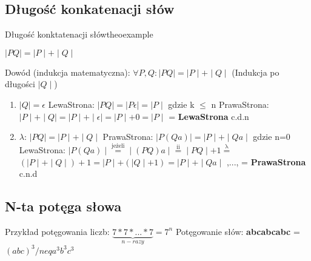 	\subsection{Długość konkatenacji słów}
		\begin{mytheo}{Długość konktatenacji słów}{theoexample}
	
			\begin{center}
			$\mid PQ \mid = \mid P \mid + \mid Q \mid$
			\end{center}
			
			Dowód (indukcja matematyczna):\newline
			$\forall P,Q: \mid PQ \mid = \mid P \mid + \mid Q \mid$ 
			(Indukcja po długości $\mid Q \mid$)
			
			\begin{enumerate}[label=(\roman*)]
				\item $\mid Q \mid = \epsilon$ \newline
				LewaStrona: $\mid PQ \mid = \mid P \epsilon \mid = \mid P \mid$ gdzie 
				k $ \leq $ n \newline
				PrawaStrona: $\mid P \mid + \mid Q \mid = 
				\mid P \mid + \mid \epsilon \mid = 
				\mid P \mid+ 0 = \mid P \mid $ = { \bf LewaStrona} c.d.n \newline
				  
				  
				\item  $\lambda$: $\mid PQ \mid = \mid P \mid + \mid Q \mid $ \newline
				PrawaStrona: $\mid P(Qa) \mid = \mid P \mid  + \mid Qa \mid$  gdzie n=0\newline
				LewaStrona: $ \mid P(Qa) \mid \overset{\mathrm{jeżeli}}{=} 
				\mid (PQ)a \mid \overset{\mathrm{ii}}{=} 
				\mid PQ \mid + 1 \overset{\mathrm{\lambda}}{=}$ \newline
				$(\mid P \mid + \mid Q \mid) + 1 = 
				\mid P \mid + (\mid Q \mid + 1) = 
				\mid P \mid + \mid Qa \mid$ ,..., = { \bf  PrawaStrona } c.n.d
			
			\end{enumerate} 
		\end{mytheo}

	
	\subsection{N-ta potęga słowa}
		Przykład potęgowania liczb: \textbf{$ \underbrace{7*7* ... *7}_{n-razy} = 7^{n}$}\newline
		Potęgowanie słów: \textbf{abcabcabc} = $(abc)^{3} /neq a^{3}b^{3}c^{3}$
		
